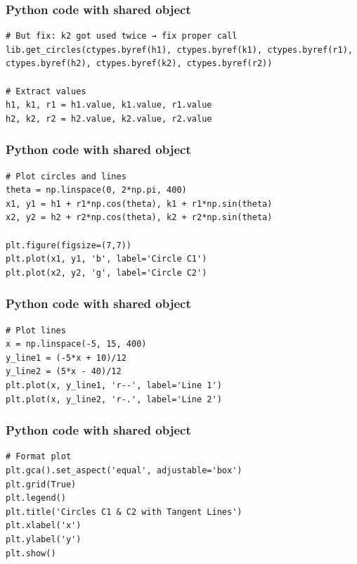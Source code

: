 \documentclass{beamer}
\begin{document}
\begin{frame}[fragile]
\frametitle{Python code with shared object}
\begin{lstlisting}
# But fix: k2 got used twice → fix proper call
lib.get_circles(ctypes.byref(h1), ctypes.byref(k1), ctypes.byref(r1), ctypes.byref(h2), ctypes.byref(k2), ctypes.byref(r2))

# Extract values
h1, k1, r1 = h1.value, k1.value, r1.value
h2, k2, r2 = h2.value, k2.value, r2.value
\end{lstlisting}
\end{frame}
\begin{frame}[fragile]
\frametitle{Python code with shared object}
\begin{lstlisting}
# Plot circles and lines
theta = np.linspace(0, 2*np.pi, 400)
x1, y1 = h1 + r1*np.cos(theta), k1 + r1*np.sin(theta)
x2, y2 = h2 + r2*np.cos(theta), k2 + r2*np.sin(theta)

plt.figure(figsize=(7,7))
plt.plot(x1, y1, 'b', label='Circle C1')
plt.plot(x2, y2, 'g', label='Circle C2')
\end{lstlisting}
\end{frame}
\begin{frame}[fragile]
\frametitle{Python code with shared object}
\begin{lstlisting}
# Plot lines
x = np.linspace(-5, 15, 400)
y_line1 = (-5*x + 10)/12
y_line2 = (5*x - 40)/12
plt.plot(x, y_line1, 'r--', label='Line 1')
plt.plot(x, y_line2, 'r-.', label='Line 2')
\end{lstlisting}
\end{frame}
\begin{frame}[fragile]
\frametitle{Python code with shared object}
\begin{lstlisting}
# Format plot
plt.gca().set_aspect('equal', adjustable='box')
plt.grid(True)
plt.legend()
plt.title('Circles C1 & C2 with Tangent Lines')
plt.xlabel('x')
plt.ylabel('y')
plt.show()
\end{lstlisting}
\end{frame}
\end{document}
